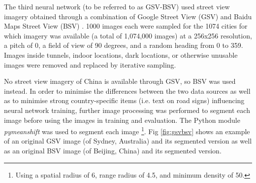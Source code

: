\documentclass[10pt,letterpaper]{article}
\begin{document}
The third neural network (to be referred to as GSV-BSV) used street view imagery obtained through a combination of Google Street View (GSV) \cite{GoogleMaps2017b} and Baidu Maps Street View (BSV) \cite{Baidu2017}. 1000 images each were sampled for the 1074 cities for which imagery was available (a total of 1,074,000 images) at a 256x256 resolution, a pitch of 0, a field of view of 90 degrees, and a random heading from 0 to 359. Images inside tunnels, indoor locations, dark locations, or otherwise unusable images were removed and replaced by iterative sampling.

No street view imagery of China is available through GSV, so BSV was used instead.  In order to minimise the differences between the two data sources as well as to minimise strong country-specific items (i.e. text on road signs) influencing neural network training, further image processing was performed to segment each image before using the images in training and evaluation. The Python module \textit{pymeanshift} \cite{Pymeanshift2017} was used to segment each image \footnote{Using a spatial radius of 6, range radius of 4.5, and minimum density of 50.}. Fig \ref{fig:gsvbsv} shows an example of an original GSV image (of Sydney, Australia) and its segmented version as well as an original BSV image (of Beijing, China) and its segmented version.
\end{document}
